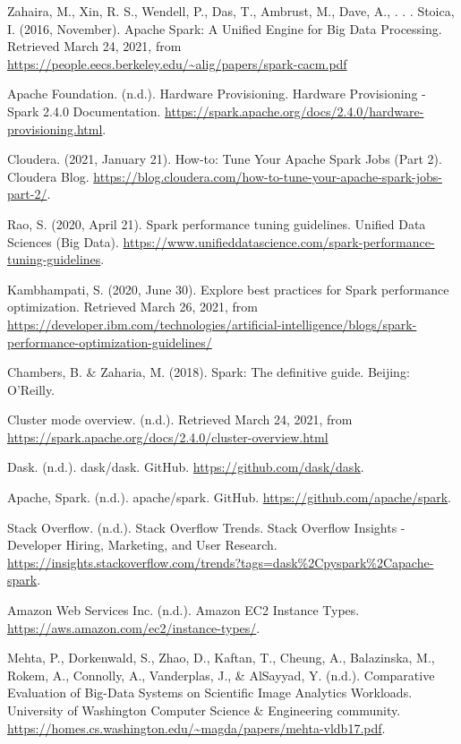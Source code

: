 \documentclass[11pt, oneside]{book}
\begin{document}
\begin{thebibliography}{111}
 Zahaira, M., Xin, R. S., Wendell, P., Das, T., Ambrust, M., Dave, A., . . . Stoica, I. (2016, November). Apache Spark: A Unified Engine for Big Data Processing. Retrieved March 24, 2021, from \url{https://people.eecs.berkeley.edu/~alig/papers/spark-cacm.pdf}

 Apache Foundation. (n.d.). Hardware Provisioning. Hardware Provisioning - Spark 2.4.0 Documentation. \url{https://spark.apache.org/docs/2.4.0/hardware-provisioning.html}.

 Cloudera. (2021, January 21). How-to: Tune Your Apache Spark Jobs (Part 2). Cloudera Blog. \url{https://blog.cloudera.com/how-to-tune-your-apache-spark-jobs-part-2/}. 

 Rao, S. (2020, April 21). Spark performance tuning guidelines. Unified Data Sciences (Big Data). \url{https://www.unifieddatascience.com/spark-performance-tuning-guidelines}. 

 Kambhampati, S. (2020, June 30). Explore best practices for Spark performance optimization. Retrieved March 26, 2021, from \url{https://developer.ibm.com/technologies/artificial-intelligence/blogs/spark-performance-optimization-guidelines/}

 Chambers, B. \& Zaharia, M. (2018). Spark: The definitive guide. Beijing: O'Reilly.

 Cluster mode overview. (n.d.). Retrieved March 24, 2021, from \url{https://spark.apache.org/docs/2.4.0/cluster-overview.html}


 Dask. (n.d.). dask/dask. GitHub. \url{https://github.com/dask/dask}.

 Apache, Spark. (n.d.). apache/spark. GitHub. \url{https://github.com/apache/spark}.

 Stack Overflow. (n.d.). Stack Overflow Trends. Stack Overflow Insights - Developer Hiring, Marketing, and User Research. \url{https://insights.stackoverflow.com/trends?tags=dask\%2Cpyspark\%2Capache-spark}.   

 Amazon Web Services Inc. (n.d.). Amazon EC2 Instance Types.  \url{https://aws.amazon.com/ec2/instance-types/}.

 Mehta, P., Dorkenwald, S., Zhao, D., Kaftan, T., Cheung, A., Balazinska, M., Rokem, A., Connolly, A., Vanderplas, J.,  \& AlSayyad, Y. (n.d.). Comparative Evaluation of Big-Data Systems on Scientific Image Analytics Workloads. University of Washington Computer Science \& Engineering community. \url{https://homes.cs.washington.edu/~magda/papers/mehta-vldb17.pdf}. 


\end{thebibliography}
\end{document}
